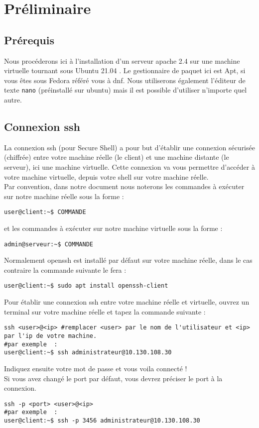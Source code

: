 \section{Préliminaire}
\subsection{Prérequis}
Nous procéderons ici à l'installation d'un serveur apache 2.4 sur une machine virtuelle tournant sous Ubuntu 21.04 .  Le gestionnaire de paquet ici est Apt, si vous êtes sous Fedora référé vous à dnf. Nous utiliserons également l'éditeur de texte \texttt{nano} (préinstallé sur ubuntu) mais il est possible d'utiliser n'importe quel autre.

\subsection{Connexion ssh}
La connexion ssh (pour Secure Shell) a pour but d'établir une connexion sécurisée (chiffrée) entre votre machine réelle (le client) et une machine distante (le serveur), ici une machine virtuelle. Cette connexion va vous permettre d'accéder à votre machine virtuelle, depuis votre shell sur votre machine réelle. \\
Par convention, dans notre document nous noterons les commandes à exécuter sur notre machine réelle sous la forme : 
\begin{verbatim}
user@client:~$ COMMANDE
\end{verbatim}
et les commandes à exécuter sur notre machine virtuelle sous la forme : 
\begin{verbatim}
admin@serveur:~$ COMMANDE
\end{verbatim}
Normalement openssh est installé par défaut sur votre machine réelle, dans le cas contraire la commande suivante le fera :
\begin{verbatim}
user@client:~$ sudo apt install openssh-client
\end{verbatim}

Pour établir une connexion ssh entre votre machine réelle et virtuelle, ouvrez un terminal sur votre machine réelle et tapez la commande suivante : 
\begin{verbatim}
ssh <user>@<ip> #remplacer <user> par le nom de l'utilisateur et <ip> par l'ip de votre machine.
#par exemple  :
user@client:~$ ssh administrateur@10.130.108.30
\end{verbatim}
Indiquez ensuite votre mot de passe et vous voila connecté !\\
Si vous avez changé le port par défaut, vous devrez préciser le port à la connexion. 
\begin{verbatim}
ssh -p <port> <user>@<ip>
#par exemple  :
user@client:~$ ssh -p 3456 administrateur@10.130.108.30
\end{verbatim}

